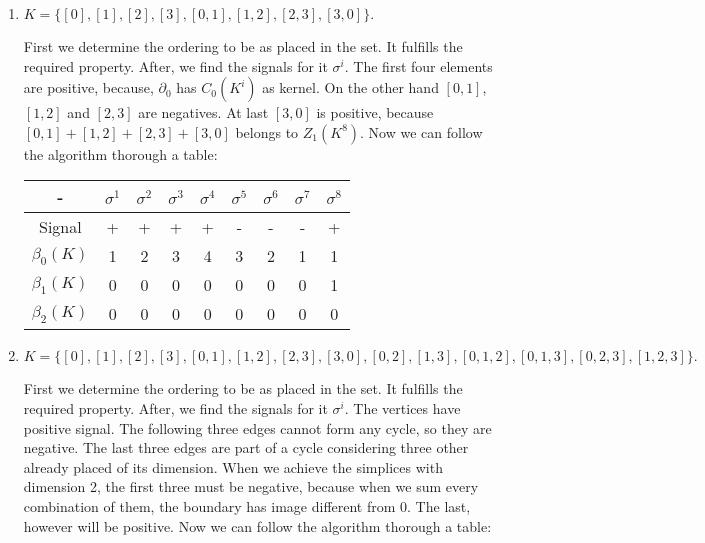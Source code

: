 \begin{enumerate}
    \item    $K = \{[0], [1], [2], [3], [0, 1], [1, 2], [2, 3], [3, 0]\}.$
    
    First we determine the ordering to be as placed in the set. It fulfills the
    required property. After, we find the signals for it $\sigma^i$. The first
    four elements are positive, because, $\partial_0$ has $C_0(K^i)$ as
    kernel. On the other hand $[0,1]$, $[1,2]$ and $[2,3]$ are negatives. At
    last $[3,0]$ is positive, because $[0,1] + [1,2] + [2,3] + [3,0]$ belongs
    to $Z_1(K^8)$. Now we can follow the algorithm thorough a table: 

    \begin{center}
        \begin{tabular}{ c|c|c|c|c|c|c|c|c}
         - & $\sigma^1$ & $\sigma^2$ & $\sigma^3$ & $\sigma^4$ & $\sigma^5$ &
         $\sigma^6$ & $\sigma^7$ &$\sigma^8$ \\ 
         \hline
         Signal & + & + & + & + & - & - & - & + \\  
         $\beta_0(K)$ & 1 & 2 & 3 & 4 & 3 & 2 & 1 & 1 \\ 
         $\beta_1(K)$ & 0 & 0 & 0 & 0 & 0 & 0 & 0 & 1\\     
         $\beta_2(K)$ & 0 & 0 & 0 & 0 & 0 & 0 & 0 & 0\\     

        \end{tabular}
    \end{center}

    \item  $K = \{[0], [1], [2], [3], [0, 1], [1, 2], [2, 3], [3, 0], [0, 2], [1, 3], [0, 1, 2], [0, 1, 3], [0, 2, 3], [1, 2, 3]\}.
    $
    
    First we determine the ordering to be as placed in the set. It fulfills
    the required property. After, we find the signals for it $\sigma^i$.  The vertices have positive signal. The following three edges cannot form any cycle, so they are negative. The last three edges are part of a cycle considering three other already placed of its dimension. When we achieve the simplices with dimension 2, the first three must be negative, because when we sum every combination of them, the boundary has image different from 0. The last, however will be positive.  
    Now we can follow the algorithm thorough a table: 


\end{enumerate}
